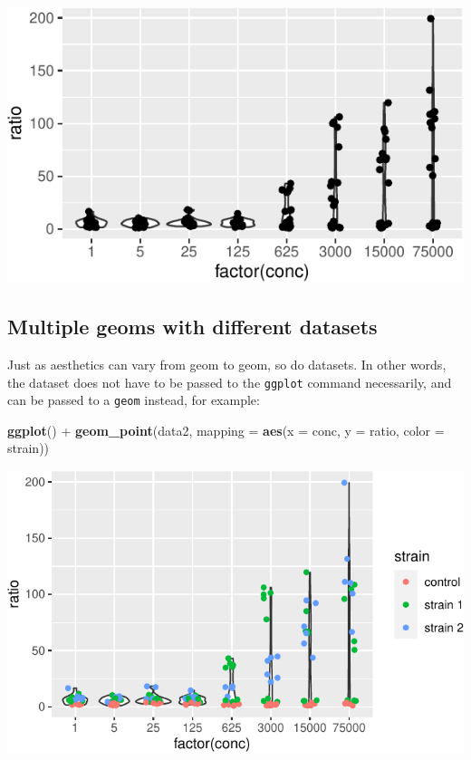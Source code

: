 \documentclass[]{book}
\newenvironment{Shaded}{}{}
\newcommand{\DataTypeTok}[1]{\textcolor[rgb]{0.56,0.13,0.00}{#1}}
\newcommand{\KeywordTok}[1]{\textcolor[rgb]{0.00,0.44,0.13}{\textbf{#1}}}
\newcommand{\NormalTok}[1]{#1}
\newcommand{\OperatorTok}[1]{\textcolor[rgb]{0.40,0.40,0.40}{#1}}
\newcommand{\StringTok}[1]{\textcolor[rgb]{0.25,0.44,0.63}{#1}}
\begin{document}
\begin{center}\includegraphics[width=\textwidth]{TRES-Tidy-Tutorial_files/figure-latex/unnamed-chunk-122-1} \end{center}

\hypertarget{multiple-geoms-with-different-datasets}{%
\subsection{Multiple geoms with different datasets}\label{multiple-geoms-with-different-datasets}}

Just as aesthetics can vary from geom to geom, so do datasets. In other words, the dataset does not have to be passed to the \texttt{ggplot} command necessarily, and can be passed to a \texttt{geom} instead, for example:

\begin{Shaded}
\begin{Highlighting}[]
\KeywordTok{ggplot}\NormalTok{() }\OperatorTok{+}
\StringTok{  }\KeywordTok{geom_point}\NormalTok{(data2, }\DataTypeTok{mapping =} \KeywordTok{aes}\NormalTok{(}\DataTypeTok{x =}\NormalTok{ conc, }\DataTypeTok{y =}\NormalTok{ ratio, }\DataTypeTok{color =}\NormalTok{ strain))}
\end{Highlighting}
\end{Shaded}

\begin{center}\includegraphics[width=\textwidth]{TRES-Tidy-Tutorial_files/figure-latex/unnamed-chunk-123-1} \end{center}
\end{document}
